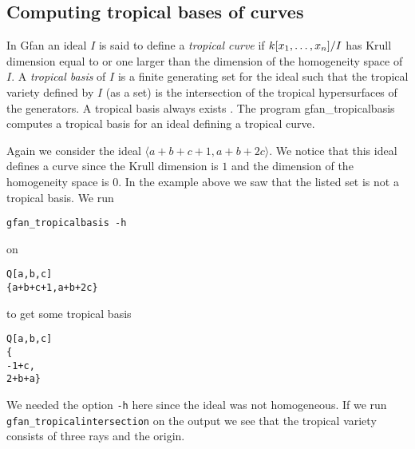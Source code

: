 \subsection{Computing tropical bases of curves}
In Gfan an ideal $I$ is said to define a \emph{tropical curve} if
$k[{x}_1,\dots,x_n]/I$ has Krull dimension equal to or one larger than the
dimension of the homogeneity space of $I$.  A \emph{tropical basis} of $I$ is
a finite generating set for the ideal such that the tropical variety
defined by $I$ (as a set) is the intersection of the tropical
hypersurfaces of the generators. A tropical basis always exists \cite{ctv}.  The
program \textup{gfan\_tropicalbasis} computes a tropical basis for an
ideal defining a tropical curve.
\begin{example}
Again we consider the ideal $\langle a+b+c+1,a+b+2c\rangle$. We notice that this ideal defines a curve since the Krull dimension is $1$ and the dimension of the homogeneity space is $0$. In the example above we saw that the listed set is not a tropical basis. We run
\begin{verbatim}
gfan_tropicalbasis -h
\end{verbatim}
on
\begin{verbatim}
Q[a,b,c]
{a+b+c+1,a+b+2c}
\end{verbatim}
to get some tropical basis
\begin{verbatim}
Q[a,b,c]
{
-1+c,
2+b+a}
\end{verbatim}
We needed the option \texttt{-h} here since the ideal was not homogeneous. If we run \texttt{gfan\_tropicalintersection} on the output we see that the tropical variety consists of three rays and the origin.
\end{example}


